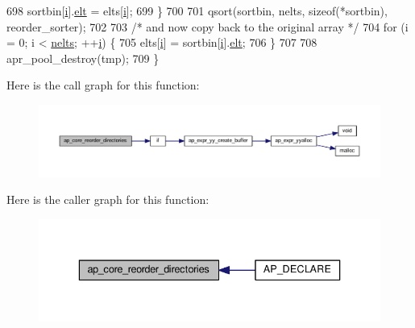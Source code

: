 \begin{DoxyCode}
698         sortbin[\hyperlink{group__MOD__PROXY_ga38403a0592eb8018a3ad61aef0f7ca2c}{i}].\hyperlink{structreorder__sort__rec_a03c45772bd657334bb1f5fac33d1a5f8}{elt} = elts[\hyperlink{group__MOD__PROXY_ga38403a0592eb8018a3ad61aef0f7ca2c}{i}];
699     \}
700 
701     qsort(sortbin, nelts, \textcolor{keyword}{sizeof}(*sortbin), reorder\_sorter);
702 
703     \textcolor{comment}{/* and now copy back to the original array */}
704     \textcolor{keywordflow}{for} (i = 0; i < \hyperlink{group__APACHE__CORE__PROTO_ga3f892b271cc0564b2d8e9536a96abd7c}{nelts}; ++\hyperlink{group__MOD__PROXY_ga38403a0592eb8018a3ad61aef0f7ca2c}{i}) \{
705         elts[\hyperlink{group__MOD__PROXY_ga38403a0592eb8018a3ad61aef0f7ca2c}{i}] = sortbin[\hyperlink{group__MOD__PROXY_ga38403a0592eb8018a3ad61aef0f7ca2c}{i}].\hyperlink{structreorder__sort__rec_a03c45772bd657334bb1f5fac33d1a5f8}{elt};
706     \}
707 
708     apr\_pool\_destroy(tmp);
709 \}
\end{DoxyCode}


Here is the call graph for this function\+:
\nopagebreak
\begin{figure}[H]
\begin{center}
\leavevmode
\includegraphics[width=350pt]{group__APACHE__CORE__HTTPD_gac5142771a693b025760ed4048352b73c_cgraph}
\end{center}
\end{figure}




Here is the caller graph for this function\+:
\nopagebreak
\begin{figure}[H]
\begin{center}
\leavevmode
\includegraphics[width=336pt]{group__APACHE__CORE__HTTPD_gac5142771a693b025760ed4048352b73c_icgraph}
\end{center}
\end{figure}


